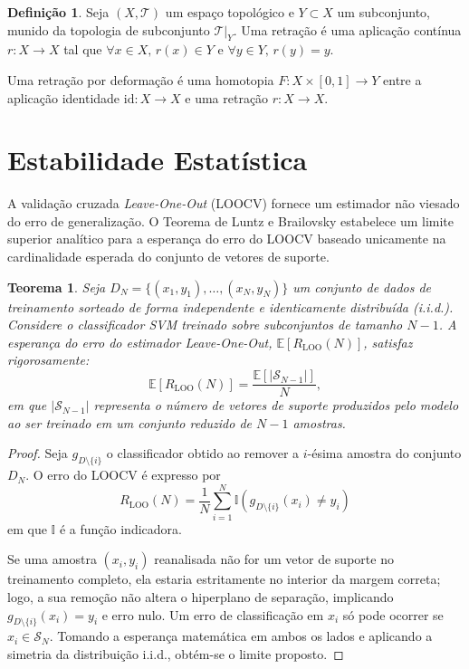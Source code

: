 \documentclass[12pt, a4paper]{article}
\theoremstyle{plain}
\newtheorem{theorem}{Teorema}[section]
\theoremstyle{definition}
\newtheorem{definition}{Definição}[section]
\theoremstyle{remark}
\newcommand{\ident}{\hspace{2em}}
\begin{document}
\begin{definition}
Seja $(X, \mathcal{T})$ um espaço topológico e $Y \subset X$ um subconjunto, munido da topologia de subconjunto $\mathcal{T}|_Y$. Uma retração é uma aplicação contínua $r: X \to X$ tal que $\forall x \in X,\, r(x) \in Y$ e $\forall y \in Y,\, r(y) = y$.

Uma retração por deformação é uma homotopia $F: X \times [0,1] \to Y$ entre a aplicação identidade $\mathrm{id}: X \to X$ e uma retração $r: X \to X$.
\end{definition}

\section{Estabilidade Estatística} \label{apx:loocv}

\ident A validação cruzada \textit{Leave-One-Out} (LOOCV) fornece um estimador não viesado do erro de generalização. O Teorema de Luntz e Brailovsky estabelece um limite superior analítico para a esperança do erro do LOOCV baseado unicamente na cardinalidade esperada do conjunto de vetores de suporte.

\begin{theorem}
Seja $D_N = \{(x_1, y_1), \dots, (x_N, y_N)\}$ um conjunto de dados de treinamento sorteado de forma independente e identicamente distribuída (i.i.d.). Considere o classificador SVM treinado sobre subconjuntos de tamanho $N-1$. A esperança do erro do estimador \textit{Leave-One-Out}, $\mathbb{E}[R_{\text{LOO}}(N)]$, satisfaz rigorosamente:
\begin{equation*}
\mathbb{E}\left[ R_{\text{LOO}}(N) \right] = \frac{\mathbb{E}\left[ |\mathcal{S}_{N-1}| \right]}{N},
\end{equation*}
em que $|\mathcal{S}_{N-1}|$ representa o número de vetores de suporte produzidos pelo modelo ao ser treinado em um conjunto reduzido de $N-1$ amostras.
\end{theorem}

\begin{proof}
Seja $g_{D \setminus \{i\}}$ o classificador obtido ao remover a $i$-ésima amostra do conjunto $D_N$. O erro do LOOCV é expresso por 
\[
R_{\text{LOO}}(N) = \frac{1}{N} \sum_{i=1}^{N} \mathbb{I}\left( g_{D \setminus \{i\}}(x_i) \neq y_i \right)
\]
em que $\mathbb{I}$ é a função indicadora. 

Se uma amostra $(x_i, y_i)$ reanalisada não for um vetor de suporte no treinamento completo, ela estaria estritamente no interior da margem correta; logo, a sua remoção não altera o hiperplano de separação, implicando $g_{D \setminus \{i\}}(x_i) = y_i$ e erro nulo. Um erro de classificação em $x_i$ só pode ocorrer se $x_i \in \mathcal{S}_N$. Tomando a esperança matemática em ambos os lados e aplicando a simetria da distribuição i.i.d., obtém-se o limite proposto.
\end{proof}
\end{document}
